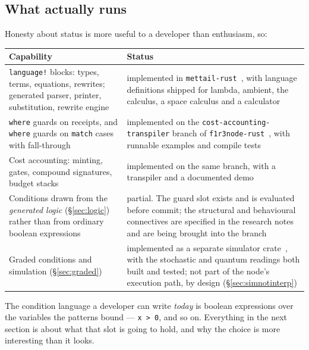 \subsection{What actually runs}
\label{sec:status}

Honesty about status is more useful to a developer than enthusiasm, so:

\begin{center}
\small
\begin{tabular}{@{}L{0.40\textwidth}L{0.52\textwidth}@{}}
\toprule
\textbf{Capability} & \textbf{Status} \\
\midrule
\texttt{language!} blocks: types, terms, equations, rewrites; generated parser,
printer, substitution, rewrite engine &
implemented in \texttt{mettail-rust}~\cite{mettailrust}, with language
definitions shipped for
lambda, ambient, the \rhoc{} calculus, a space calculus and a calculator \\[3pt]
\texttt{where} guards on receipts, and \texttt{where} guards on \texttt{match}
cases with fall-through &
implemented on the \texttt{cost-accounting-transpiler} branch of
\texttt{f1r3node-rust}~\cite{f1r3node}, with runnable examples and compile tests \\[3pt]
Cost accounting: minting, gates, compound signatures, budget stacks &
implemented on the same branch, with a transpiler and a documented demo \\[3pt]
Conditions drawn from the \emph{generated logic} (\S\ref{sec:logic}) rather than
from ordinary boolean expressions &
partial. The guard slot exists and is evaluated before commit; the structural
and behavioural connectives are specified in the research notes and are being
brought into the branch \\[3pt]
Graded conditions and simulation (\S\ref{sec:graded}) &
implemented as a separate simulator crate~\cite{WeightedGSLT}, with the
stochastic and quantum readings both built and tested; not part of the node's execution path, by
design (\S\ref{sec:simnotinterp}) \\
\bottomrule
\end{tabular}
\end{center}

The condition language a developer can write \emph{today} is boolean expressions
over the variables the patterns bound --- \texttt{x > 0}, and so on. Everything
in the next section is about what that slot is going to hold, and why the choice
is more interesting than it looks.
